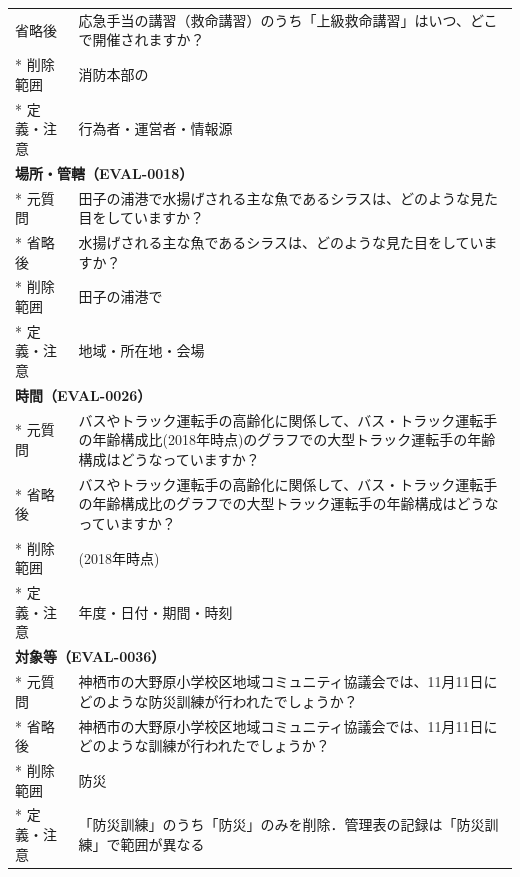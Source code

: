 \documentclass[twocolumn,a4paper,10pt]{ltjsarticle}
\begin{document}
\begin{longtable}{p{22mm}p{145mm}}
省略後 & 応急手当の講習（救命講習）のうち「上級救命講習」はいつ、どこで開催されますか？ \\*
削除範囲 & 消防本部の \\*
定義・注意 & 行為者・運営者・情報源 \\
\toprule
\multicolumn{2}{l}{\textbf{場所・管轄（EVAL-0018）}} \\*
元質問 & 田子の浦港で水揚げされる主な魚であるシラスは、どのような見た目をしていますか？ \\*
省略後 & 水揚げされる主な魚であるシラスは、どのような見た目をしていますか？ \\*
削除範囲 & 田子の浦港で \\*
定義・注意 & 地域・所在地・会場 \\
\toprule
\multicolumn{2}{l}{\textbf{時間（EVAL-0026）}} \\*
元質問 & バスやトラック運転手の高齢化に関係して、バス・トラック運転手の年齢構成比(2018年時点)のグラフでの大型トラック運転手の年齢構成はどうなっていますか？ \\*
省略後 & バスやトラック運転手の高齢化に関係して、バス・トラック運転手の年齢構成比のグラフでの大型トラック運転手の年齢構成はどうなっていますか？ \\*
削除範囲 & (2018年時点) \\*
定義・注意 & 年度・日付・期間・時刻 \\
\toprule
\multicolumn{2}{l}{\textbf{対象等（EVAL-0036）}} \\*
元質問 & 神栖市の大野原小学校区地域コミュニティ協議会では、11月11日にどのような防災訓練が行われたでしょうか？ \\*
省略後 & 神栖市の大野原小学校区地域コミュニティ協議会では、11月11日にどのような訓練が行われたでしょうか？ \\*
削除範囲 & 防災 \\*
定義・注意 & 「防災訓練」のうち「防災」のみを削除．管理表の記録は「防災訓練」で範囲が異なる \\
\bottomrule\end{longtable}\endgroup

\twocolumn
\end{document}
